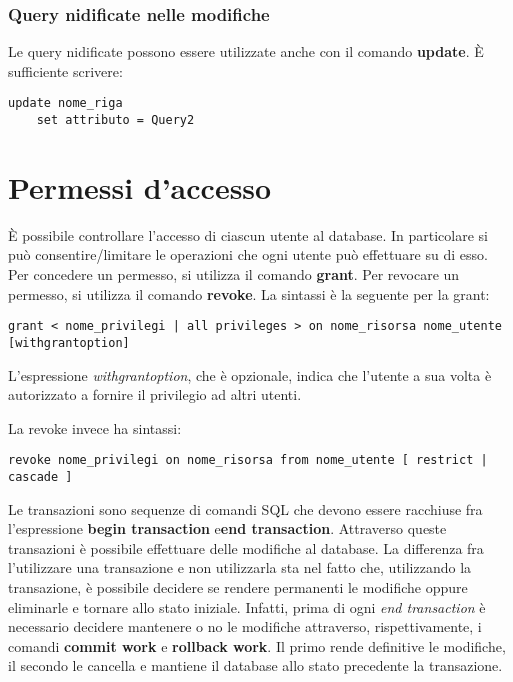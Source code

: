 \documentclass[\main/main.tex]{subfiles}
\begin{document}
\subsubsection{Query nidificate nelle modifiche}
Le query nidificate possono essere utilizzate anche con il comando \textbf{update}.
È sufficiente scrivere:
\begin{verbatim}
update nome_riga
    set attributo = Query2
\end{verbatim}

\section{Permessi d'accesso}
È possibile controllare l'accesso di ciascun utente al database. In particolare si può consentire/limitare le operazioni che ogni utente può effettuare su di esso.
Per concedere un permesso, si utilizza il comando \textbf{grant}. Per revocare un permesso, si utilizza il comando \textbf{revoke}.
La sintassi è la seguente per la grant:
\begin{verbatim}
grant < nome_privilegi | all privileges > on nome_risorsa nome_utente [withgrantoption]
  \end{verbatim}
L'espressione \textit{withgrantoption}, che è opzionale, indica che l'utente a sua volta è autorizzato a fornire il privilegio ad altri utenti.

La revoke invece ha sintassi:
\begin{verbatim}
revoke nome_privilegi on nome_risorsa from nome_utente [ restrict | cascade ]
\end{verbatim}

Le transazioni sono sequenze di comandi SQL che devono essere racchiuse fra l'espressione \textbf{begin transaction} e\textbf{end transaction}. Attraverso queste transazioni è possibile effettuare delle modifiche al database.
La differenza fra l'utilizzare una transazione e non utilizzarla sta nel fatto che, utilizzando la transazione, è possibile decidere se rendere permanenti le modifiche oppure eliminarle e tornare allo stato iniziale.
Infatti, prima di ogni \textit{end transaction} è necessario decidere mantenere o no le modifiche attraverso, rispettivamente, i comandi \textbf{commit work} e \textbf{rollback work}. Il primo rende definitive le modifiche, il secondo le cancella e mantiene il database allo stato precedente la transazione.
\end{document}
